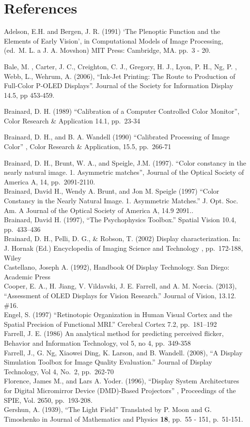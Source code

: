 \documentclass[
  letterpaper,
]{book}
\begin{document}
\section{References}\label{references}

Adelson, E.H. and Bergen, J. R. (1991) `The Plenoptic Function and the
Elements of Early Vision', in Computational Models of Image Processing,
(ed.~M. L. a J. A. Movshon) MIT Press: Cambridge, MA. pp.~3 - 20.

Bale, M. , Carter, J. C., Creighton, C. J., Gregory, H. J., Lyon, P. H.,
Ng, P. , Webb, L., Wehrum, A. (2006), ``Ink-Jet Printing: The Route to
Production of Full-Color P-OLED Displays''. Journal of the Society for
Information Display 14.5, pp 453-459.

Brainard, D. H. (1989) ``Calibration of a Computer Controlled Color
Monitor'', Color Research \& Application 14.1, pp.~23-34

Brainard, D. H., and B. A. Wandell (1990) ``Calibrated Processing of
Image Color'' , Color Research \& Application, 15.5, pp.~266-71

Brainard, D. H., Brunt, W. A., and Speigle, J.M. (1997). ``Color
constancy in the nearly natural image. 1. Asymmetric matches'', Journal
of the Optical Society of America A, 14, pp.~2091-2110.\\
Brainard, David H., Wendy A. Brunt, and Jon M. Speigle (1997) ``Color
Constancy in the Nearly Natural Image. 1. Asymmetric Matches.'' J. Opt.
Soc. Am. A Journal of the Optical Society of America A, 14.9 2091..\\
Brainard, David H. (1997), ``The Psychophysics Toolbox.'' Spatial Vision
10.4, pp.~433--436\\
Brainard, D. H., Pelli, D. G., \& Robson, T. (2002) Display
characterization. In: J. Hornak (Ed.) Encyclopedia of Imaging Science
and Technology , pp.~172-188, Wiley\\
Castellano, Joseph A. (1992), Handbook Of Display Technology. San Diego:
Academic Press\\
Cooper, E. A., H. Jiang, V. Vildavski, J. E. Farrell, and A. M. Norcia.
(2013), ``Assessment of OLED Displays for Vision Research.'' Journal of
Vision, 13.12. \#16.\\
Engel, S. (1997) ``Retinotopic Organization in Human Visual Cortex and
the Spatial Precision of Functional MRI.'' Cerebral Cortex 7.2,
pp.~181--192\\
Farrell, J. E. (1986) An analytical method for predicting perceived
flicker, Behavior and Information Technology, vol 5, no 4, pp.~349-358\\
Farrell, J., G. Ng, Xiaowei Ding, K. Larson, and B. Wandell. (2008), ``A
Display Simulation Toolbox for Image Quality Evaluation.'' Journal of
Display Technology, Vol 4, No.~2, pp.~262-70\\
Florence, James M., and Lars A. Yoder. (1996), ``Display System
Architectures for Digital Micromirror Device (DMD)-Based Projectors'' ,
Proceedings of the SPIE, Vol. 2650, pp.~193-208.\\
Gershun, A. (1939), ``The Light Field'' Translated by P. Moon and G.
Timoshenko in Journal of Mathematics and Physics \textbf{18}, pp.~55 -
151, p.~51-151.
\end{document}
